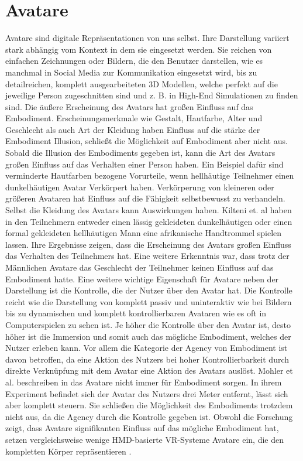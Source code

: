 \section{Avatare}
Avatare sind digitale Repräsentationen von uns selbst. Ihre Darstellung variiert stark abhängig vom Kontext in dem sie eingesetzt werden. Sie reichen von einfachen Zeichnungen oder Bildern, die den Benutzer darstellen, wie es manchmal in Social Media zur Kommunikation eingesetzt wird, bis zu detailreichen, komplett ausgearbeiteten 3D Modellen, welche perfekt auf die jeweilige Person zugeschnitten sind und z. B. in High-End Simulationen zu finden sind.
Die äußere Erscheinung des Avatars hat großen Einfluss auf das Embodiment. Erscheinungsmerkmale wie Gestalt, Hautfarbe, Alter und Geschlecht als auch Art der Kleidung haben Einfluss auf die stärke der Embodiment Illusion, schließt die Möglichkeit auf Embodiment aber nicht aus. Sobald die Illusion des Embodiments gegeben ist, kann die Art des Avatars großen Einfluss auf das Verhalten einer Person haben. Ein Beispiel dafür sind verminderte Hautfarben bezogene Vorurteile, wenn hellhäutige Teilnehmer einen dunkelhäutigen Avatar Verkörpert haben. Verkörperung von kleineren oder größeren Avataren hat Einfluss auf die Fähigkeit selbstbewusst zu verhandeln. Selbst die Kleidung des Avatars kann Auswirkungen haben. Kilteni et. al haben in\cite{Kilteni2013} den Teilnehmern entweder einen lässig gekleideten dunkelhäutigen oder einen formal gekleideten hellhäutigen Mann eine afrikanische Handtrommel spielen lassen. Ihre Ergebnisse zeigen, dass die Erscheinung des Avatars großen Einfluss das Verhalten des Teilnehmers hat. Eine weitere Erkenntnis war, dass trotz der Männlichen Avatare das Geschlecht der Teilnehmer keinen Einfluss auf das Embodiment hatte.
Eine weitere wichtige Eigenschaft für Avatare neben der Darstellung ist die Kontrolle, die der Nutzer über den Avatar hat. Die Kontrolle reicht wie die Darstellung von komplett passiv und uninteraktiv wie bei Bildern bis zu dynamischen und komplett kontrollierbaren Avataren wie es oft in Computerspielen zu sehen ist. Je höher die Kontrolle über den Avatar ist, desto höher ist die Immersion und somit auch das mögliche Embodiment, welches der Nutzer erleben kann. Vor allem die Kategorie der Agency von Embodiment ist davon betroffen, da eine Aktion des Nutzers bei hoher Kontrollierbarkeit durch direkte Verknüpfung mit dem Avatar eine Aktion des Avatars auslöst.\cite{Biocca2014} Mohler et al. beschreiben in \cite{Mohler2010} das Avatare nicht immer für Embodiment sorgen. In ihrem Experiment befindet sich der Avatar des Nutzers drei Meter entfernt, lässt sich aber komplett steuern. Sie schließen die Möglichkeit des Embodiments trotzdem nicht aus, da die Agency durch die Kontrolle gegeben ist.
Obwohl die Forschung zeigt, dass Avatare signifikanten Einfluss auf das mögliche Embodiment hat, setzen vergleichsweise wenige HMD-basierte VR-Systeme Avatare ein, die den kompletten Körper repräsentieren \cite{Pan2017}.


